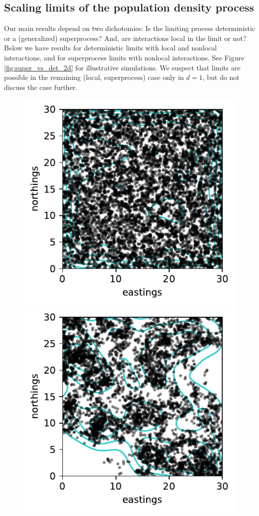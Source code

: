 \documentclass[12pt]{article}
\begin{document}
\subsection{Scaling limits of the population density process}

Our main results depend on two dichotomies:
Is the limiting process deterministic or a (generalized) superprocess?
And, are interactions local in the limit or not?
Below we have results for deterministic limits with local and nonlocal interactions,
and for superprocess limits with nonlocal interactions.
See Figure \ref{fig:super_vs_det_2d} for illustrative simulations.
We suspect that limits are possible in the remaining (local, superprocess) case
only in $d=1$, but do not discuss the case further.


\begin{figure}
    \begin{center}
        \includegraphics{figures/ex1a/fkpp_123.locations}
        \includegraphics{figures/ex1b/fkpp_123.locations}

\end{center}
\end{figure}
\end{document}
